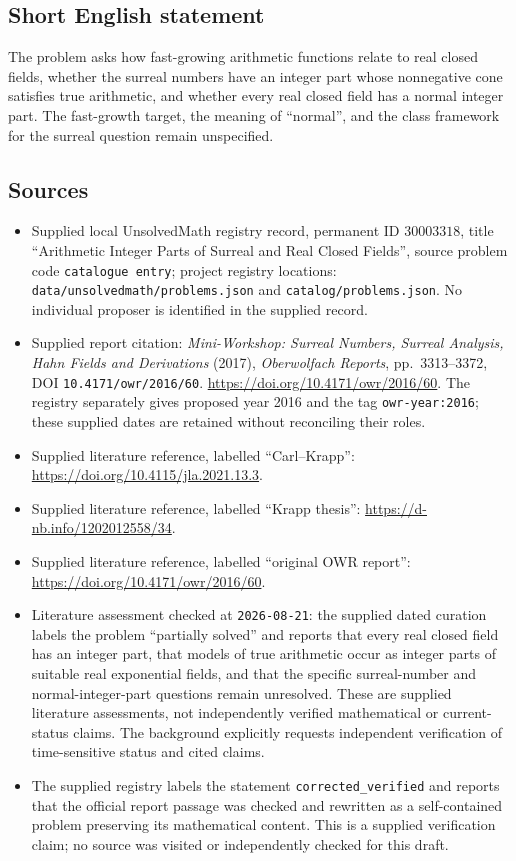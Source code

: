 \documentclass[11pt]{article}
\begin{document}
\subsection{Short English statement}
The problem asks how fast-growing arithmetic functions relate to real closed fields, whether the surreal numbers have an integer part whose nonnegative cone satisfies true arithmetic, and whether every real closed field has a normal integer part. The fast-growth target, the meaning of ``normal'', and the class framework for the surreal question remain unspecified.
\subsection{Sources}
\begin{itemize}
\item Supplied local UnsolvedMath registry record, permanent ID \(30003318\), title ``Arithmetic Integer Parts of Surreal and Real Closed Fields'', source problem code \texttt{catalogue entry}; project registry locations: \texttt{data/unsolvedmath/problems.json} and \texttt{catalog/problems.json}. No individual proposer is identified in the supplied record.
\item Supplied report citation: \emph{Mini-Workshop: Surreal Numbers, Surreal Analysis, Hahn Fields and Derivations} (2017), \emph{Oberwolfach Reports}, pp.\ 3313--3372, DOI \texttt{10.4171/owr/2016/60}. \url{https://doi.org/10.4171/owr/2016/60}. The registry separately gives proposed year 2016 and the tag \texttt{owr-year:2016}; these supplied dates are retained without reconciling their roles.
\item Supplied literature reference, labelled ``Carl--Krapp'': \url{https://doi.org/10.4115/jla.2021.13.3}.
\item Supplied literature reference, labelled ``Krapp thesis'': \url{https://d-nb.info/1202012558/34}.
\item Supplied literature reference, labelled ``original OWR report'': \url{https://doi.org/10.4171/owr/2016/60}.
\item Literature assessment checked at \texttt{2026-08-21}: the supplied dated curation labels the problem ``partially solved'' and reports that every real closed field has an integer part, that models of true arithmetic occur as integer parts of suitable real exponential fields, and that the specific surreal-number and normal-integer-part questions remain unresolved. These are supplied literature assessments, not independently verified mathematical or current-status claims. The background explicitly requests independent verification of time-sensitive status and cited claims.
\item The supplied registry labels the statement \texttt{corrected\_verified} and reports that the official report passage was checked and rewritten as a self-contained problem preserving its mathematical content. This is a supplied verification claim; no source was visited or independently checked for this draft.
\end{itemize}
\end{document}
